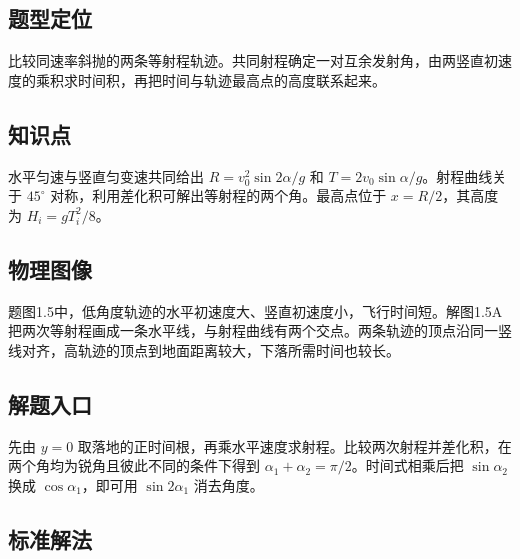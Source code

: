 \documentclass[UTF8,fontset=fandol,a4paper,11pt]{ctexart}
\begin{document}


\subsection*{题型定位}

比较同速率斜抛的两条等射程轨迹。共同射程确定一对互余发射角，由两竖直初速度的乘积求时间积，再把时间与轨迹最高点的高度联系起来。



\subsection*{知识点}

水平匀速与竖直匀变速共同给出 $R=v_0^2\sin2\alpha/g$ 和 $T=2v_0\sin\alpha/g$。射程曲线关于 $45^\circ$ 对称，利用差化积可解出等射程的两个角。最高点位于 $x=R/2$，其高度为 $H_i=gT_i^2/8$。




\subsection*{物理图像}

题图1.5中，低角度轨迹的水平初速度大、竖直初速度小，飞行时间短。解图1.5A把两次等射程画成一条水平线，与射程曲线有两个交点。两条轨迹的顶点沿同一竖线对齐，高轨迹的顶点到地面距离较大，下落所需时间也较长。



\subsection*{解题入口}

先由 $y=0$ 取落地的正时间根，再乘水平速度求射程。比较两次射程并差化积，在两个角均为锐角且彼此不同的条件下得到 $\alpha_1+\alpha_2=\pi/2$。时间式相乘后把 $\sin\alpha_2$ 换成 $\cos\alpha_1$，即可用 $\sin2\alpha_1$ 消去角度。



\subsection*{标准解法}
\end{document}
